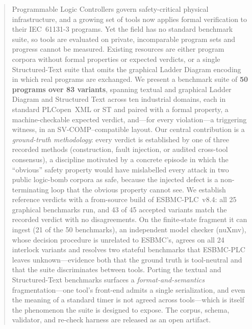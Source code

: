 \documentclass[smallextended]{svjour3}   %
\begin{document}
\begin{abstract}
Programmable Logic Controllers govern safety-critical physical infrastructure, and a
growing set of tools now applies formal verification to their IEC~61131-3 programs. Yet
the field has no standard benchmark suite, so tools are evaluated on private, incomparable
program sets and progress cannot be measured. Existing resources are either program corpora
without formal properties or expected verdicts, or a single Structured-Text suite that omits
the graphical Ladder Diagram encoding in which real programs are exchanged. We present a
benchmark suite of \textbf{50 programs over 83 variants}, spanning textual and graphical
Ladder Diagram and Structured Text across ten industrial domains, each in standard
PLCopen~XML or ST and paired with a formal property, a machine-checkable expected verdict,
and---for every violation---a triggering witness, in an SV-COMP--compatible layout. Our
central contribution is a \emph{ground-truth methodology}: every verdict is established by
one of three recorded methods (construction, fault injection, or audited cross-tool
consensus), a discipline motivated by a concrete episode in which the ``obvious'' safety
property would have mislabelled every attack in two public logic-bomb corpora as safe,
because the injected defect is a non-terminating loop that the obvious property cannot see.
We establish reference verdicts with a from-source build of ESBMC-PLC~v8.4: all 25 graphical
benchmarks run, and 43 of 45 accepted variants match the recorded verdict with no
disagreements. On the finite-state fragment it can ingest (21 of the 50 benchmarks), an
independent model checker (nuXmv), whose decision procedure is unrelated to ESBMC's, agrees on
all 24 interlock variants and resolves two stateful benchmarks that ESBMC-PLC leaves
unknown---evidence both that the ground truth is tool-neutral and that the suite discriminates
between tools. Porting the textual and
Structured-Text benchmarks surfaces a
\emph{format-and-semantics} fragmentation---one tool's front-end admits a single
serialization, and even the meaning of a standard timer is not agreed across tools---which
is itself the phenomenon the suite is designed to expose. The corpus, schema, validator,
and re-check harness are released as an open artifact.
\end{abstract}


\end{document}
